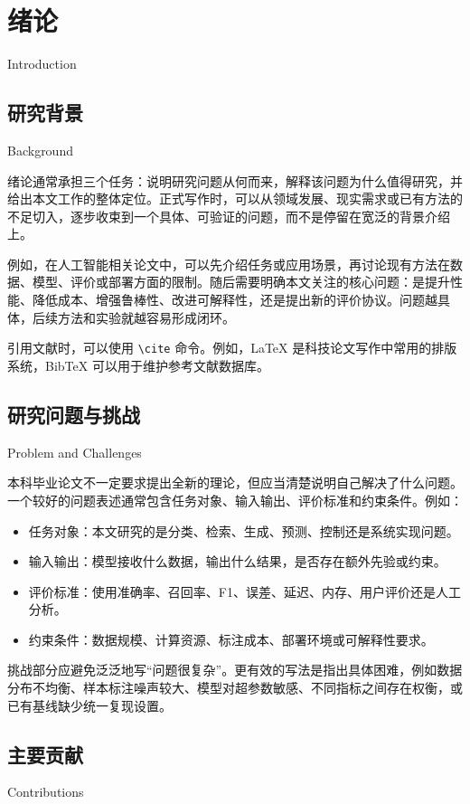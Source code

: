 \chapter{绪论}{Introduction}

\section{研究背景}{Background}

绪论通常承担三个任务：说明研究问题从何而来，解释该问题为什么值得研究，并给出本文工作的整体定位。正式写作时，可以从领域发展、现实需求或已有方法的不足切入，逐步收束到一个具体、可验证的问题，而不是停留在宽泛的背景介绍上。

例如，在人工智能相关论文中，可以先介绍任务或应用场景，再讨论现有方法在数据、模型、评价或部署方面的限制。随后需要明确本文关注的核心问题：是提升性能、降低成本、增强鲁棒性、改进可解释性，还是提出新的评价协议。问题越具体，后续方法和实验就越容易形成闭环。

引用文献时，可以使用 \verb|\cite| 命令。例如，\LaTeX{} 是科技论文写作中常用的排版系统\cite{lamport1994latex}，BibTeX 可以用于维护参考文献数据库\cite{patashnik1988bibtexing}。

\section{研究问题与挑战}{Problem and Challenges}

本科毕业论文不一定要求提出全新的理论，但应当清楚说明自己解决了什么问题。一个较好的问题表述通常包含任务对象、输入输出、评价标准和约束条件。例如：

\begin{itemize}
    \item 任务对象：本文研究的是分类、检索、生成、预测、控制还是系统实现问题。
    \item 输入输出：模型接收什么数据，输出什么结果，是否存在额外先验或约束。
    \item 评价标准：使用准确率、召回率、F1、误差、延迟、内存、用户评价还是人工分析。
    \item 约束条件：数据规模、计算资源、标注成本、部署环境或可解释性要求。
\end{itemize}

挑战部分应避免泛泛地写“问题很复杂”。更有效的写法是指出具体困难，例如数据分布不均衡、样本标注噪声较大、模型对超参数敏感、不同指标之间存在权衡，或已有基线缺少统一复现设置。

\section{主要贡献}{Contributions}

